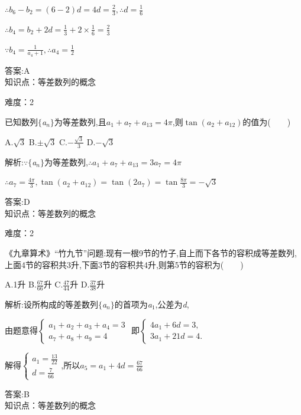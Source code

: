 \documentclass{article} %
\begin{document}
$\therefore b_6 - b_2 = (6-2)d = 4d = \frac{2}{3}, \therefore d = \frac{1}{6}$

$\therefore b_4=b_2+2d=\frac{1}{3}+2\times \frac{1}{6} = \frac{2}{3}$
 
$\because b_4 = \frac{1}{a_4+1}, \therefore a_4 = \frac{1}{2}$

 答案:A \\

知识点：等差数列的概念

难度：2

 已知数列$\mathrm{\{}$\textit{a${}_{n}$}$\mathrm{\}}$为等差数列,且$a_1+a_7+a_{13}=4\pi$,则$\tan(a_2+a_{12})$的值为(\textit{　　})

 A.$\sqrt{3}$ B.$\pm \sqrt{3}$ C.$-\frac{\sqrt{3}}{3}$ D.$-\sqrt{3}$

 解析:\textit{$\because$}$\mathrm{\{}$\textit{a${}_{n}$}$\mathrm{\}}$为等差数列,$\therefore a_1+a_7+a_{13} = 3a_7 = 4\pi$

$\therefore a_7 = \frac{4\pi}{3}, \tan(a_2+a_{12}) = \tan(2a_7) = \tan\frac{8\pi}{3}=-\sqrt{3}$

 答案:D \\

知识点：等差数列的概念

难度：2

 《九章算术》``竹九节''问题:现有一根9节的竹子,自上而下各节的容积成等差数列,上面4节的容积共3升,下面3节的容积共4升,则第5节的容积为(\textit{　　})

 A.1升 B.$\frac{67}{66}$升 C.$\frac{47}{44}$升 D.$\frac{37}{38}$升

 解析:设所构成的等差数列$\mathrm{\{}$\textit{a${}_{n}$}$\mathrm{\}}$的首项为\textit{a}${}_{1}$,公差为\textit{d},

由题意得$\left\{
\begin{array}{l}
a_1+a_2+a_3+a_4=3 \\
a_7+a_8+a_9=4
\end{array}
\right.$ 即$\left\{
\begin{array}{l}
4a_1+6d=3, \\
3a_1+21d=4.
\end{array}
\right.$

解得$\left\{
\begin{array}{l}
a_1=\frac{13}{22} \\
d=\frac{7}{66}
\end{array}
\right.$,所以$a_5 = a_1+4d = \frac{67}{66}$

 答案:B \\

知识点：等差数列的概念
\end{document}
